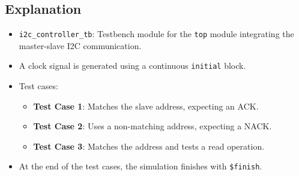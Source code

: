 \documentclass[a4paper,12pt]{report}
\begin{document}
\subsection{Explanation}
\begin{itemize}
    \item \texttt{i2c\_controller\_tb}: Testbench module for the \texttt{top} module integrating the master-slave I2C communication.
    \item A clock signal is generated using a continuous \texttt{initial} block.
    \item Test cases:
        \begin{itemize}
            \item \textbf{Test Case 1}: Matches the slave address, expecting an ACK.
            \item \textbf{Test Case 2}: Uses a non-matching address, expecting a NACK.
            \item \textbf{Test Case 3}: Matches the address and tests a read operation.
        \end{itemize}
    \item At the end of the test cases, the simulation finishes with \texttt{\$finish}.
\end{itemize}
\newpage
\end{document}
